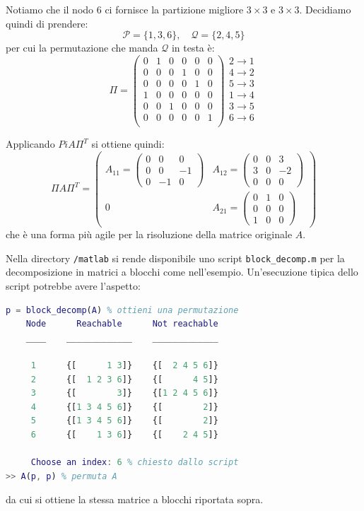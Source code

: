 \documentclass[a4paper,11pt]{article}
\begin{document}
Notiamo che il nodo 6 ci fornisce la partizione migliore $3 \times 3$ e $3 \times 3$.
Decidiamo quindi di prendere:
$$
\mathcal{P} = \{ 1, 3, 6 \}, \quad \mathcal{Q} = \{ 2, 4, 5 \}
$$
per cui la permutazione che manda $\mathcal{Q}$ in testa è:
$$
\Pi = \begin{pmatrix}
	0 & 1 & 0 & 0 & 0 & 0 \\
	0 & 0 & 0 & 1 & 0 & 0 \\
	0 & 0 & 0 & 0 & 1 & 0 \\
	1 & 0 & 0 & 0 & 0 & 0 \\
	0 & 0 & 1 & 0 & 0 & 0 \\
	0 & 0 & 0 & 0 & 0 & 1 \\
\end{pmatrix}
\begin{array}{c}
	2 \rightarrow 1 \\
	4 \rightarrow 2 \\
	5 \rightarrow 3 \\
	1 \rightarrow 4 \\
	3 \rightarrow 5 \\
	6 \rightarrow 6 \\
\end{array}
$$

Applicando $Pi A \Pi^T$ si ottiene quindi:
$$
\Pi A \Pi^T = \begin{pmatrix}
	A_{11} =
	\begin{pmatrix}
		0 &  0 &  0 \\
		0 &  0 & -1 \\
		0 & -1 &  0
	\end{pmatrix} &
	A_{12} = 
	\begin{pmatrix}
		0 &  0 &  3 \\
		3 &  0 & -2 \\
		0 &  0 &  0
	\end{pmatrix} \\
	0 &
	A_{21} = 
	\begin{pmatrix}
		0 &  1 &  0 \\
		0 &  0 &  0 \\
		1 &  0 &  0
	\end{pmatrix}
\end{pmatrix}
$$
che è una forma più agile per la risoluzione della matrice originale $A$.

Nella directory \lstinline|/matlab| si rende disponibile uno script \lstinline|block_decomp.m| per la decomposizione in matrici a blocchi come nell'esempio.
Un'esecuzione tipica dello script potrebbe avere l'aspetto:
\begin{lstlisting}[language=matlab, style=codestyle]	
p = block_decomp(A) % ottieni una permutazione
    Node      Reachable      Not reachable
    ____    _____________    _____________

     1      {[      1 3]}    {[  2 4 5 6]}
     2      {[  1 2 3 6]}    {[      4 5]}
     3      {[        3]}    {[1 2 4 5 6]}
     4      {[1 3 4 5 6]}    {[        2]}
     5      {[1 3 4 5 6]}    {[        2]}
     6      {[    1 3 6]}    {[    2 4 5]}
   
	 Choose an index: 6 % chiesto dallo script
>> A(p, p) % permuta A
\end{lstlisting}
da cui si ottiene la stessa matrice a blocchi riportata sopra.
\end{document}
